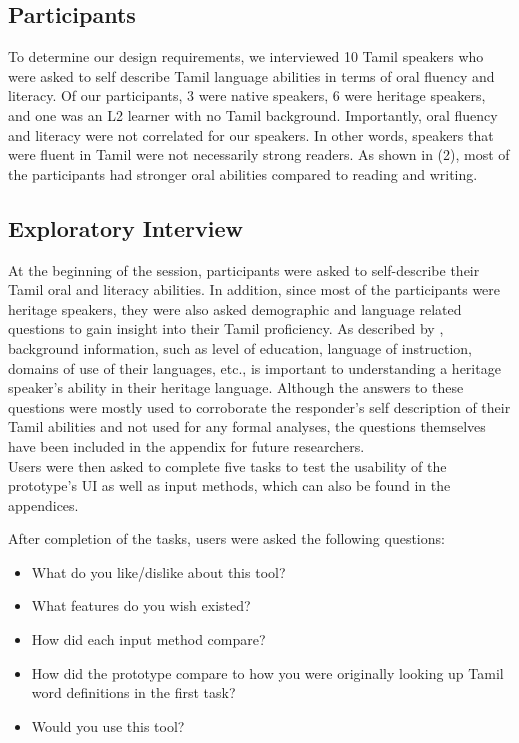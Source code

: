 \documentclass[11pt]{article}
\begin{document}
\subsection{Participants}
To determine our design requirements, we interviewed 10 Tamil speakers 
who were asked to self describe Tamil language abilities in terms of oral fluency and literacy. 
Of our participants, 3 were native speakers, 6 were heritage speakers, and one was an L2 learner 
with no Tamil background. Importantly, oral fluency and literacy were not correlated for our speakers. 
In other words, speakers that were fluent in Tamil were not necessarily strong readers. 
As shown in (2), most of the participants had stronger oral abilities compared to reading and writing. 

\subsection{Exploratory Interview}
At the beginning of the session, participants were asked to self-describe their 
Tamil oral and literacy abilities. In addition, since most of the participants were heritage speakers, 
they were also asked demographic and language related questions to gain insight into their Tamil proficiency. 
As described by \citet{montrul_heritage_2016}, background information, 
such as level of education, language of instruction, domains of use of their languages, etc., 
is important to understanding a heritage speaker’s ability in their heritage language.
Although the answers to these questions were mostly used to corroborate the 
responder’s self description of their Tamil abilities and not used for any formal analyses, 
the questions themselves have been included in the appendix for future researchers. 
\\
Users were then asked to complete five tasks to test the usability of the prototype’s UI as well as input methods, 
which can also be found in the appendices.  

After completion of the tasks, users were asked the following questions:
\begin{itemize}
  \item What do you like/dislike about this tool?
  \item What features do you wish existed?
  \item How did each input method compare?
  \item How did the prototype compare to how you were originally looking up Tamil word definitions in the first task?
  \item Would you use this tool?
\end{itemize}
\end{document}

